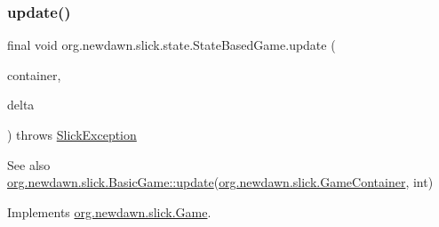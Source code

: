 \subsubsection{\texorpdfstring{update()}{update()}}
{\footnotesize\ttfamily final void org.\+newdawn.\+slick.\+state.\+State\+Based\+Game.\+update (\begin{DoxyParamCaption}\item[{\mbox{\hyperlink{classorg_1_1newdawn_1_1slick_1_1_game_container}{Game\+Container}}}]{container,  }\item[{int}]{delta }\end{DoxyParamCaption}) throws \mbox{\hyperlink{classorg_1_1newdawn_1_1slick_1_1_slick_exception}{Slick\+Exception}}\hspace{0.3cm}{\ttfamily [inline]}}

\begin{DoxySeeAlso}{See also}
\mbox{\hyperlink{classorg_1_1newdawn_1_1slick_1_1_basic_game_acfe6fa05aef83bff1631af91a3e4bd20}{org.\+newdawn.\+slick.\+Basic\+Game\+::update}}(\mbox{\hyperlink{classorg_1_1newdawn_1_1slick_1_1_game_container}{org.\+newdawn.\+slick.\+Game\+Container}}, int) 
\end{DoxySeeAlso}


Implements \mbox{\hyperlink{interfaceorg_1_1newdawn_1_1slick_1_1_game_ab07b2e9463ee4631620dde0de25bdee8}{org.\+newdawn.\+slick.\+Game}}.


